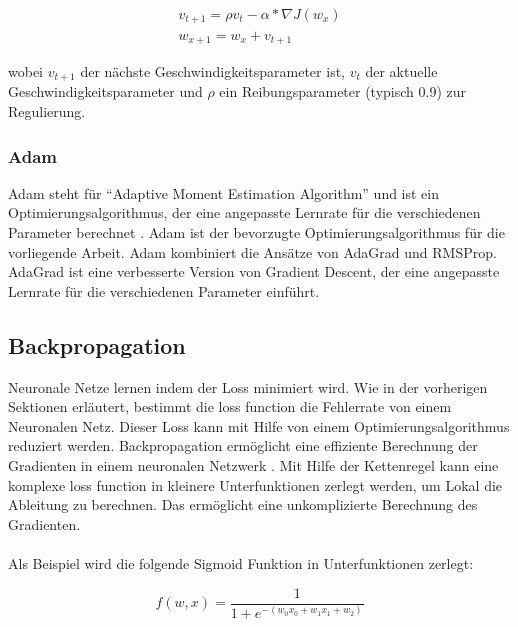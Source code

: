 \begin{equation}
  \begin{gathered}
    v_{t+1} = \rho v_t - \alpha * \nabla J(w_x) \\
    w_{x+1} = w_x + v_{t+1}
  \end{gathered}
\end{equation}

wobei $v_{t+1}$ der nächste Geschwindigkeitsparameter ist, $v_t$ der aktuelle Geschwindigkeitsparameter und $\rho$ ein Reibungsparameter 
(typisch 0.9) zur Regulierung.

\subsubsection{Adam}
Adam steht für ``Adaptive Moment Estimation Algorithm'' und ist ein Optimierungsalgorithmus, der eine angepasste Lernrate für die verschiedenen
Parameter berechnet \cite{kingma2014adam}. Adam ist der bevorzugte Optimierungsalgorithmus für die vorliegende Arbeit. 
Adam kombiniert die Ansätze von AdaGrad \cite{duchi2011adaptive} und RMSProp. AdaGrad ist eine 
verbesserte Version von Gradient Descent, der eine angepasste Lernrate für die verschiedenen Parameter einführt. 



\subsection{Backpropagation}\label{subsection:backpropagation}
Neuronale Netze lernen indem der Loss minimiert wird. Wie in der vorherigen Sektionen erläutert, bestimmt die \gls{loss function}
die Fehlerrate von einem Neuronalen Netz. Dieser Loss kann mit Hilfe von einem Optimierungsalgorithmus reduziert werden. 
Backpropagation ermöglicht eine effiziente Berechnung der Gradienten in einem neuronalen Netzwerk \cite{was-ist-backpropagation}. 
Mit Hilfe der Kettenregel kann eine komplexe \gls{loss function} in kleinere Unterfunktionen zerlegt werden, um Lokal die Ableitung zu berechnen.
Das ermöglicht eine unkomplizierte Berechnung des Gradienten.
\\
\\
Als Beispiel wird die folgende Sigmoid Funktion in Unterfunktionen zerlegt:

\begin{equation}
  f(w,x) = \frac{1}{1+e^{-(w_0 x_0 + w_1 x_1 + w_2)}}
\end{equation}

